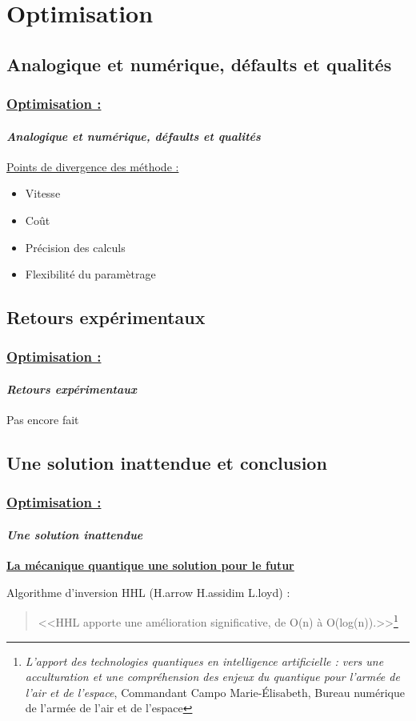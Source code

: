 \documentclass[10pt]{beamer}
\begin{document}
	\section{Optimisation}
	\subsection{Analogique et num\'erique, d\'efaults et qualit\'es}
	\begin{frame}
		\frametitle{\uline{Optimisation :}}
		\framesubtitle{\textit{Analogique et num\'erique, d\'efaults et qualit\'es}}
		\uline{Points de divergence des m\'ethode :}
		\begin{itemize}
     		\item Vitesse
     		\item Co\^ut
     		\item Pr\'ecision des calculs
     		\item Flexibilit\'e du param\`etrage
 		\end{itemize}
	\end{frame}
	\subsection{Retours exp\'erimentaux}
	\begin{frame}
		\frametitle{\uline{Optimisation :}}
		\framesubtitle{\textit{Retours exp\'erimentaux}}
		Pas encore fait
	\end{frame}
	\subsection{Une solution inattendue et conclusion}
	\begin{frame}
		\frametitle{\uline{Optimisation :}}
		\framesubtitle{\textit{Une solution inattendue}}
		\centering
  		\uline{\textbf{La m\'ecanique quantique une solution pour le futur}}
  		\par
  		\vfill
		Algorithme d'inversion HHL (H.arrow H.assidim L.loyd) :
		\begin{quote}
			<<HHL apporte une amélioration significative, de O(n) à O(log(n)).>>\footnote{\textit{L’apport des technologies quantiques en intelligence artificielle : vers une acculturation et une compr\'ehension des enjeux du quantique pour l’arm\'ee de l’air et de l’espace}, Commandant Campo Marie-\'Elisabeth, Bureau num\'erique de l’arm\'ee de l’air et de l’espace}
		\end{quote}
	\end{frame}
	
\end{document}
